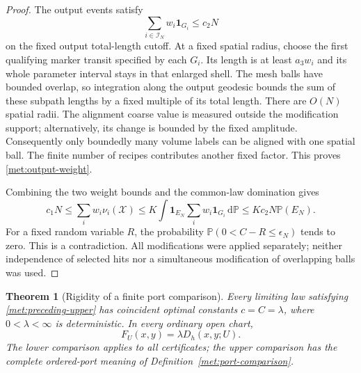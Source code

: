 \documentclass[11pt]{article}
\numberwithin{equation}{section}
\newtheorem{theorem}{Theorem}[section]
\theoremstyle{definition}
\theoremstyle{remark}
\newcommand{\PP}{\mathbb P}
\newcommand{\dd}{\mathrm d}
\newcommand{\1}{\mathbf 1}
\begin{document}
\begin{proof}
The output events satisfy
\begin{equation}
 \sum_{i\in\mathcal I_N}w_i\1_{G_i}
 \leq c_2N
 \label{met:output-weight}
\end{equation}
on the fixed output total-length cutoff.  At a fixed spatial radius,
choose the first qualifying marker transit specified by each $G_i$.
Its length is at least $a_3w_i$ and its whole parameter interval
stays in that enlarged shell.  The mesh balls have bounded overlap,
so integration along the output geodesic bounds the sum of these
subpath lengths by a fixed multiple of its total length.  There are $O(N)$ spatial radii.  The
alignment coarse value is measured outside the modification support;
alternatively, its change is bounded by the fixed amplitude.
Consequently only boundedly many volume labels can be aligned with
one spatial ball.  The finite number of recipes contributes another
fixed factor.  This proves \eqref{met:output-weight}.

Combining the two weight bounds and the common-law domination gives
\[
 c_1N
 \leq\sum_iw_i\nu_i(\mathcal X)
 \leq K\int\1_{E_N}\sum_iw_i\1_{G_i}\,\dd\PP
 \leq Kc_2N\PP(E_N).
\]
For a fixed random variable $R$, the probability
$\PP(0<C-R\leq\epsilon_N)$ tends to zero.  This is a
contradiction.  All modifications were applied separately; neither
independence of selected hits nor a simultaneous modification of
overlapping balls was used.
\end{proof}

\begin{theorem}[Rigidity of a finite port comparison]
\label{met:rigidity}
Every limiting law satisfying \eqref{met:preceding-upper} has
coincident optimal constants $c=C=\lambda$, where
$0<\lambda<\infty$ is deterministic.  In every ordinary open chart,
\[
 F_U(x,y)=\lambda D_h(x,y;U).
\]
The lower comparison applies to all certificates; the upper
comparison has the complete ordered-port meaning of
Definition~\ref{met:port-comparison}.
\end{theorem}
\end{document}

